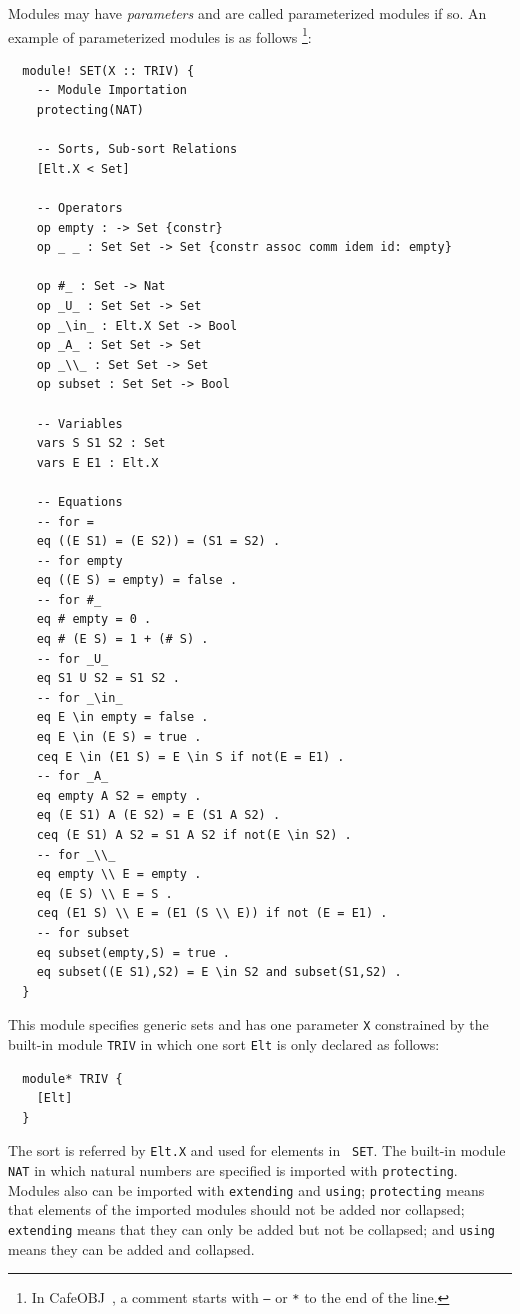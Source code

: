 \documentclass[12pt]{report}
\newcommand{\cafeobj}{{\sf CafeOBJ}~}
\begin{document}
Modules may have {\it parameters} and are called parameterized modules
if so. An example of parameterized modules is as follows
\footnote{In \cafeobj, a comment starts with {\tt --} or {\tt **} to
  the end of the line.}:
\small
\begin{verbatim}
  module! SET(X :: TRIV) {
    -- Module Importation
    protecting(NAT)
  
    -- Sorts, Sub-sort Relations
    [Elt.X < Set]
  
    -- Operators
    op empty : -> Set {constr}
    op _ _ : Set Set -> Set {constr assoc comm idem id: empty}
  
    op #_ : Set -> Nat
    op _U_ : Set Set -> Set
    op _\in_ : Elt.X Set -> Bool
    op _A_ : Set Set -> Set
    op _\\_ : Set Set -> Set
    op subset : Set Set -> Bool
  
    -- Variables
    vars S S1 S2 : Set
    vars E E1 : Elt.X
  
    -- Equations
    -- for =
    eq ((E S1) = (E S2)) = (S1 = S2) .
    -- for empty
    eq ((E S) = empty) = false .
    -- for #_
    eq # empty = 0 .   
    eq # (E S) = 1 + (# S) . 
    -- for _U_
    eq S1 U S2 = S1 S2 .
    -- for _\in_
    eq E \in empty = false .
    eq E \in (E S) = true .
    ceq E \in (E1 S) = E \in S if not(E = E1) .
    -- for _A_
    eq empty A S2 = empty .
    eq (E S1) A (E S2) = E (S1 A S2) .
    ceq (E S1) A S2 = S1 A S2 if not(E \in S2) .
    -- for _\\_ 
    eq empty \\ E = empty .
    eq (E S) \\ E = S .
    ceq (E1 S) \\ E = (E1 (S \\ E)) if not (E = E1) .
    -- for subset
    eq subset(empty,S) = true .
    eq subset((E S1),S2) = E \in S2 and subset(S1,S2) .
  }
\end{verbatim}
\normalsize
This module specifies generic sets and has one parameter {\tt X}
constrained by the built-in module {\tt TRIV} in which one sort
{\tt Elt} is only declared as follows:
\small
\begin{verbatim}
  module* TRIV {
    [Elt]
  }
\end{verbatim}
\normalsize
The sort is referred by {\tt Elt.X} and used for elements in {\tt
  SET}. The built-in module {\tt NAT} in which natural numbers are
specified is imported with {\tt protecting}. Modules also can be
imported with {\tt extending} and {\tt using}; {\tt protecting} means
that elements of the imported modules should not be added nor
collapsed; {\tt extending} means that they can only be added but not
be collapsed; and {\tt using} means they can be added and collapsed.
\end{document}
